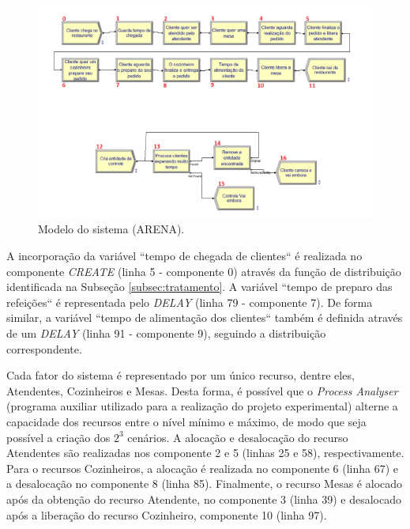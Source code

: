 \documentclass[pt,disc,oneside]{ufscpgeasthesis}
\begin{document}
			\begin{figure}[]
				\begin{center}
					\includegraphics[width=\textwidth]{./images/Figures/model_v.png}
					\caption{Modelo do sistema (ARENA).}
					\label{fig.modelo}
				\end{center}
			\end{figure}

			A incorporação da variável ``tempo de chegada de clientes`` é realizada no componente \textit{CREATE} (linha 5 - componente 0) através da função de distribuição identificada na Subseção \ref{subsec:tratamento}.
			A variável ``tempo de preparo das refeições`` é representada pelo \textit{DELAY} (linha 79 - componente 7).
			De forma similar, a variável ``tempo de alimentação dos clientes`` também é definida através de um \textit{DELAY} (linha 91 - componente 9), seguindo a distribuição correspondente.

			Cada fator do sistema é representado por um único recurso, dentre eles, Atendentes, Cozinheiros e Mesas.
			Desta forma, é possível que o \textit{Process Analyser} (programa auxiliar utilizado para a realização do projeto experimental) alterne a capacidade dos recursos entre o nível mínimo e máximo, de modo que seja possível a criação dos $2^3$ cenários.
			A alocação e desalocação do recurso Atendentes são realizadas nos componente 2 e 5 (linhas 25 e 58), respectivamente.
			Para o recursos Cozinheiros, a alocação é realizada no componente 6 (linha 67) e a desalocação no componente 8 (linha 85).
			Finalmente, o recurso Mesas é alocado após da obtenção do recurso Atendente, no componente 3 (linha 39) e desalocado após a liberação do recurso Cozinheiro, componente 10 (linha 97).
\end{document}
